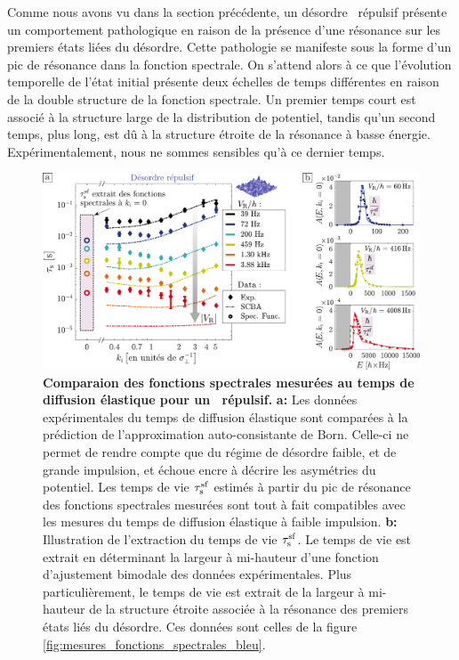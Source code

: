 Comme nous avons vu dans la section précédente, un désordre \speckle\ répulsif présente un comportement pathologique en raison de la présence d'une résonance sur les premiers états liées du désordre. Cette pathologie se manifeste sous la forme d'un pic de résonance dans la fonction spectrale. On s'attend alors à ce que l'évolution temporelle de l'état initial présente deux échelles de temps différentes en raison de la double structure de la fonction spectrale. Un premier temps court est associé à la structure large de la distribution de potentiel, tandis qu'un second temps, plus long, est dû à la structure étroite de la résonance à basse énergie. Expérimentalement, nous ne sommes sensibles qu'à ce dernier temps.

\begin{figure}
\centering
\includegraphics[width=\textwidth]{Fig/TauS_NJP/comparaison_specfunc_taus_bleu.pdf}
\caption{\textbf{Comparaion des fonctions spectrales mesurées au temps de diffusion élastique pour un \speckle\ répulsif.} \textbf{a:} Les données expérimentales du temps de diffusion élastique sont comparées à la prédiction de l'approximation auto-consistante de Born. Celle-ci ne permet de rendre compte que du régime de désordre faible, et de grande impulsion, et échoue encre à décrire les asymétries du potentiel. Les temps de vie $\tau_{\mathrm{s}}^{\mathrm{sf}}$ estimés à partir du pic de résonance des fonctions spectrales mesurées sont tout à fait compatibles avec les mesures du temps de diffusion élastique à faible impulsion. \textbf{b:} Illustration de l'extraction du temps de vie $\tau_{\mathrm{s}}^{\mathrm{sf}}$. Le temps de vie est extrait en déterminant la largeur à mi-hauteur d'une fonction d'ajustement bimodale des données expérimentales. Plus particulièrement, le temps de vie est extrait de la largeur à mi-hauteur de la structure étroite associée à la résonance des premiers états liés du désordre. Ces données sont celles de la figure \ref{fig:mesures_fonctions_spectrales_bleu}.}
\label{fig:comparaison_taus_specfunc_bleu}
\end{figure}

